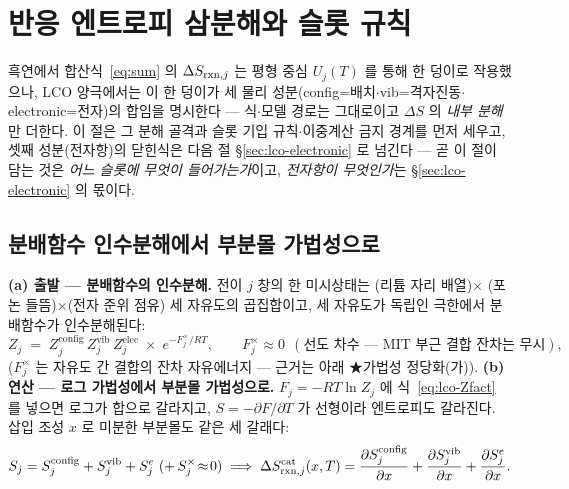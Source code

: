\section{반응 엔트로피 삼분해와 슬롯 규칙}\label{sec:lco-decomp}
흑연에서 합산식~\eqref{eq:sum} 의 $\Delta S_{\mathrm{rxn},j}$ 는 평형 중심 $U_j(T)$ 를 통해 한 덩이로 작용했으나, LCO 양극에서는 이 한 덩이가 세 물리 성분(config=배치$\cdot$vib=격자진동$\cdot$electronic=전자)의 합임을 명시한다 --- 식$\cdot$모델 경로는 그대로이고 $\Delta S$ 의 \emph{내부 분해}만 더한다. 이 절은 그 분해 골격과 슬롯 기입 규칙$\cdot$이중계산 금지 경계를 먼저 세우고, 셋째 성분(전자항)의 닫힌식은 다음 절 \S\ref{sec:lco-electronic} 로 넘긴다 --- 곧 이 절이 담는 것은 \emph{어느 슬롯에 무엇이 들어가는가}이고, \emph{전자항이 무엇인가}는 \S\ref{sec:lco-electronic} 의 몫이다.

\subsection{분배함수 인수분해에서 부분몰 가법성으로}\label{sec:lco-decomp-add}
\textbf{(a) 출발 --- 분배함수의 인수분해.} 전이 $j$ 창의 한 미시상태는 (리튬 자리 배열)$\times$
(포논 들뜸)$\times$(전자 준위 점유) 세 자유도의 곱집합이고, 세 자유도가 독립인 극한에서 분배함수가
인수분해된다:
\begin{equation}
Z_j\;=\;Z_j^\mathrm{config}\,Z_j^\mathrm{vib}\,Z_j^\mathrm{elec}\;\times\;e^{-F_j^{\times}/RT},
\qquad F_j^{\times}\approx0\ \ (\text{선도 차수 --- MIT 부근 결합 잔차는 무시}),
\label{eq:lco-Zfact}
\end{equation}
($F_j^{\times}$ 는 자유도 간 결합의 잔차 자유에너지 --- 근거는 아래 ★가법성 정당화(가)). \textbf{(b) 연산 --- 로그
가법성에서 부분몰 가법성으로.} $F_j=-RT\ln Z_j$ 에 식~\eqref{eq:lco-Zfact} 를 넣으면 로그가 합으로
갈라지고, $S=-\partial F/\partial T$ 가 선형이라 엔트로피도 갈라진다. 삽입 조성 $x$ 로 미분한 부분몰도
같은 세 갈래다:
\begin{equation}
S_j=S_j^\mathrm{config}+S_j^\mathrm{vib}+S_j^{e}\ (+\,S_j^{\times}\!\approx\!0)
\;\Longrightarrow\;
\Delta S_{\rxn,j}^\mathrm{cat}(x,T)=\frac{\partial S_j^\mathrm{config}}{\partial x}
+\frac{\partial S_j^\mathrm{vib}}{\partial x}
+\frac{\partial S_j^{e}}{\partial x}.
\label{eq:lco-Sadd}
\end{equation}

